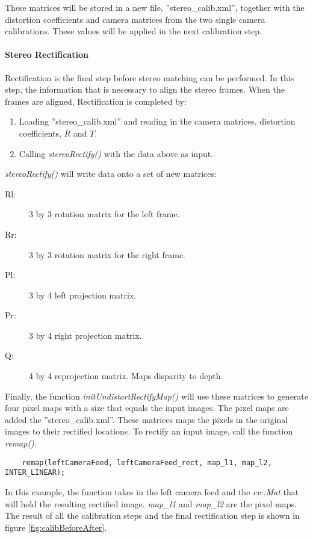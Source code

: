 These matrices will be stored in a new file, ''stereo\_calib.xml'', together with the distortion coefficients and camera matrices from the two single camera calibrations. These values will be applied in the next calibration step.

\paragraph{Stereo Rectification}

Rectification is the final step before stereo matching can be performed. In this step, the information that is necessary to align the stereo frames. When the frames are aligned, Rectification is completed by:

\begin{enumerate}
	\item Loading ''stereo\_calib.xml'' and reading in the camera matrices, distortion coefficients, $R$ and $T$.
	\item Calling \textit{stereoRectify()} with the data above as input.
\end{enumerate}

 \textit{stereoRectify()} will write data onto a set of new matrices:

\begin{description}
	\item[Rl: ] 3 by 3 rotation matrix for the left frame.
	\item[Rr: ] 3 by 3 rotation matrix for the right frame.
	\item[Pl: ] 3 by 4 left projection matrix.
	\item[Pr: ] 3 by 4 right projection matrix.
	\item[Q: ] 4 by 4 reprojection matrix. Maps disparity to depth.

\end{description}

Finally, the function \textit{initUndistortRectifyMap()} will use these matrices to generate four pixel maps with a size that equals the input images. The pixel maps are added the ''stereo\_calib.xml''. These matrices maps the pixels in the original images to their rectified locations. To rectify an input image, call the function \textit{remap()}.

\begin{verbatim}
	remap(leftCameraFeed, leftCameraFeed_rect, map_l1, map_l2, INTER_LINEAR);
\end{verbatim}

In this example, the function takes in the left camera feed and the \textit{cv::Mat} that will hold the resulting rectified image. \textit{map\_l1} and \textit{map\_l2} are the pixel maps. The result of all the calibration steps and the final rectification step is shown in figure \ref{fig:calibBeforeAfter}.

